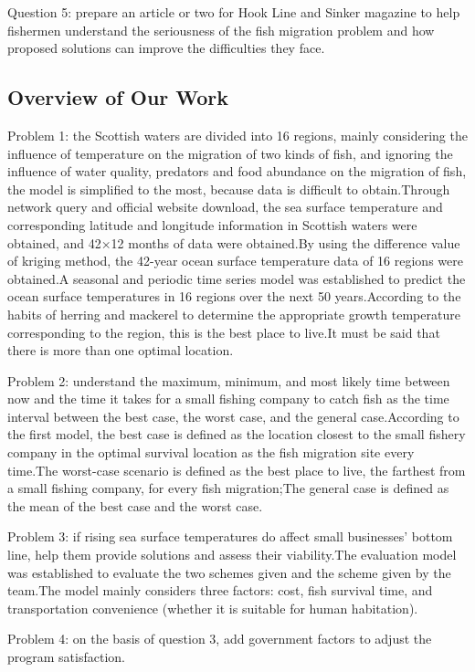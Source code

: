 \documentclass{mcmthesis}
\begin{document}
Question 5: prepare an article or two for Hook Line and Sinker magazine to help fishermen understand the seriousness of the fish migration problem and how proposed solutions can improve the difficulties they face.

\subsection{Overview of Our Work}%
Problem 1: the Scottish waters are divided into 16 regions, mainly considering the influence of temperature on the migration of two kinds of fish, and ignoring the influence of water quality, predators and food abundance on the migration of fish, the model is simplified to the most, because data is difficult to obtain.Through network query and official website download, the sea surface temperature and corresponding latitude and longitude information in Scottish waters were obtained, and 42×12 months of data were obtained.By using the difference value of kriging method, the 42-year ocean surface temperature data of 16 regions were obtained.A seasonal and periodic time series model was established to predict the ocean surface temperatures in 16 regions over the next 50 years.According to the habits of herring and mackerel to determine the appropriate growth temperature corresponding to the region, this is the best place to live.It must be said that there is more than one optimal location.

Problem 2: understand the maximum, minimum, and most likely time between now and the time it takes for a small fishing company to catch fish as the time interval between the best case, the worst case, and the general case.According to the first model, the best case is defined as the location closest to the small fishery company in the optimal survival location as the fish migration site every time.The worst-case scenario is defined as the best place to live, the farthest from a small fishing company, for every fish migration;The general case is defined as the mean of the best case and the worst case.

Problem 3: if rising sea surface temperatures do affect small businesses' bottom line, help them provide solutions and assess their viability.The evaluation model was established to evaluate the two schemes given and the scheme given by the team.The model mainly considers three factors: cost, fish survival time, and transportation convenience (whether it is suitable for human habitation).

Problem 4: on the basis of question 3, add government factors to adjust the program satisfaction.
\end{document}
